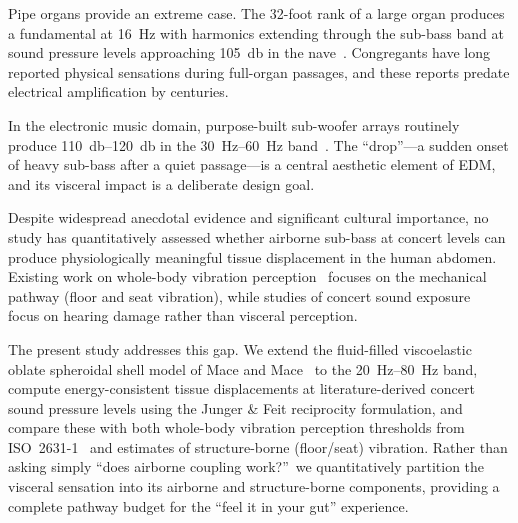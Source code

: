 Pipe organs provide an extreme case.  The 32-foot rank of a large organ
produces a fundamental at \SI{16}{\hertz} with harmonics extending
through the sub-bass band at sound pressure levels approaching
\SI{105}{\decibel} in the nave~\cite{Bickerdike1966}.  Congregants have
long reported physical sensations during full-organ passages, and these
reports predate electrical amplification by centuries.

In the electronic music domain, purpose-built sub-woofer arrays routinely
produce \SIrange{110}{120}{\decibel} in the \SIrange{30}{60}{\hertz}
band~\cite{Opperman2006}.  The ``drop''---a sudden onset of heavy
sub-bass after a quiet passage---is a central aesthetic element of EDM,
and its visceral impact is a deliberate design goal.

Despite widespread anecdotal evidence and significant cultural
importance, no study has quantitatively assessed whether airborne
sub-bass at concert levels can produce physiologically meaningful tissue
displacement in the human abdomen.  Existing work on whole-body vibration
perception~\cite{Griffin1990, Mansfield2005} focuses on the mechanical
pathway (floor and seat vibration), while studies of concert sound
exposure~\cite{Gunderson2016, Opperman2006} focus on hearing damage
rather than visceral perception.

The present study addresses this gap.  We extend the fluid-filled
viscoelastic oblate spheroidal shell model of Mace and
Mace~\cite{Mace2026browntone} to the \SIrange{20}{80}{\hertz} band,
compute energy-consistent tissue displacements at literature-derived
concert sound pressure levels using the Junger \& Feit reciprocity
formulation, and compare these with both whole-body vibration perception
thresholds from ISO~2631-1~\cite{iso2631} and estimates of
structure-borne (floor/seat) vibration.  Rather than asking simply
``does airborne coupling work?''\ we quantitatively partition the
visceral sensation into its airborne and structure-borne components,
providing a complete pathway budget for the ``feel it in your gut''
experience.
